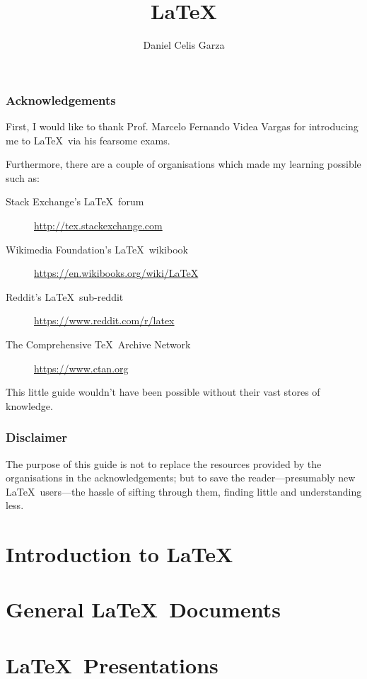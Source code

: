 \documentclass[12pt]{report}
\title{\LaTeX}[Quick-Start Guide]
\author{Daniel Celis Garza}
\begin{document}
\frontmatter
\maketitle

\section{Acknowledgements}
First, I would like to thank Prof. Marcelo Fernando Videa Vargas for
introducing me to \LaTeX~via his fearsome exams.

Furthermore, there are a couple of organisations which made my
learning possible such as:
\begin{description}
\item[Stack Exchange's \LaTeX~forum]
  \url{http://tex.stackexchange.com}
\item[Wikimedia Foundation's \LaTeX~wikibook]
  \url{https://en.wikibooks.org/wiki/LaTeX}
\item[Reddit's \LaTeX~sub-reddit]
  \url{https://www.reddit.com/r/latex}
\item[The Comprehensive \TeX~Archive Network]
  \url{https://www.ctan.org}
\end{description}
This little guide wouldn't have been possible without their vast
stores of knowledge.

\section{Disclaimer}
The purpose of this guide is not to replace the resources provided by
the organisations in the acknowledgements; but to save the
reader---presumably new \LaTeX~users---the hassle of sifting through
them, finding little and understanding less.

\clearpage
\tableofcontents
\listoftables
\listoffigures

\mainmatter

\part{Introduction to \LaTeX}



\part{General \LaTeX~Documents}






\part{\LaTeX~Presentations}



\backmatter



\end{document}
